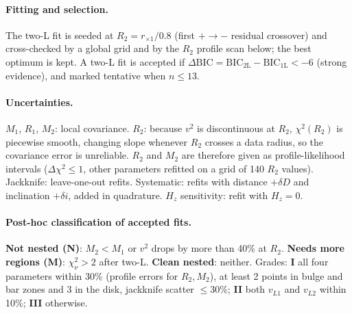 \documentclass[10pt]{article}
\begin{document}
\paragraph{Fitting and selection.} The two-L fit is seeded at $R_2=r_{\times1}/0.8$ (first $+\to-$ residual crossover) and cross-checked by a global grid and by the $R_2$ profile scan below; the best optimum is kept. A two-L fit is accepted if $\Delta\mathrm{BIC}=\mathrm{BIC_{2L}}-\mathrm{BIC_{1L}}<-6$ (strong evidence), and marked tentative when $n\le13$.
\paragraph{Uncertainties.} $M_1$, $R_1$, $M_2$: local covariance. $R_2$: because $v^2$ is discontinuous at $R_2$, $\chi^2(R_2)$ is piecewise smooth, changing slope whenever $R_2$ crosses a data radius, so the covariance error is unreliable. $R_2$ and $M_2$ are therefore given as profile-likelihood intervals ($\Delta\chi^2\le1$, other parameters refitted on a grid of 140 $R_2$ values). Jackknife: leave-one-out refits. Systematic: refits with distance $+\delta D$ and inclination $+\delta i$, added in quadrature. $H_z$ sensitivity: refit with $H_z=0$.
\paragraph{Post-hoc classification of accepted fits.} \textbf{Not nested (N)}: $M_2<M_1$ or $v^2$ drops by more than 40\% at $R_2$. \textbf{Needs more regions (M)}: $\chi^2_\nu>2$ after two-L. \textbf{Clean nested}: neither. Grades: \textbf{I} all four parameters within 30\% (profile errors for $R_2,M_2$), at least 2 points in bulge and bar zones and 3 in the disk, jackknife scatter $\le30\%$; \textbf{II} both $v_{L1}$ and $v_{L2}$ within 10\%; \textbf{III} otherwise.
\end{document}
